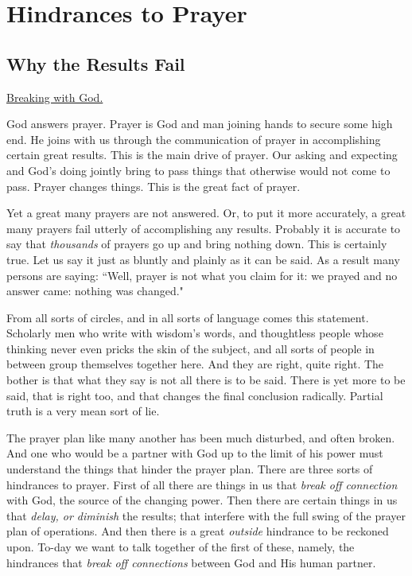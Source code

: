 \part{ Hindrances to Prayer}





\chapter{Why the Results Fail}



\underline{Breaking with God.}


God answers prayer. Prayer is God and man joining hands to secure some
high end. He joins with us through the communication of prayer in
accomplishing certain great results. This is the main drive of prayer. Our
asking and expecting and God's doing jointly bring to pass things that
otherwise would not come to pass. Prayer changes things. This is the great
fact of prayer.

Yet a great many prayers are not answered. Or, to put it more accurately,
a great many prayers fail utterly of accomplishing any results. Probably
it is accurate to say that \textit{thousands} of prayers go up and bring nothing
down. This is certainly true. Let us say it just as bluntly and plainly as
it can be said. As a result many persons are saying: ``Well, prayer is not
what you claim for it: we prayed and no answer came: nothing was changed."

From all sorts of circles, and in all sorts of language comes this
statement. Scholarly men who write with wisdom's words, and thoughtless
people whose thinking never even pricks the skin of the subject, and all
sorts of people in between group themselves together here. And they are
right, quite right. The bother is that what they say is not all there is
to be said. There is yet more to be said, that is right too, and that
changes the final conclusion radically. Partial truth is a very mean sort
of lie.

The prayer plan like many another has been much disturbed, and often
broken. And one who would be a partner with God up to the limit of his
power must understand the things that hinder the prayer plan. There are
three sorts of hindrances to prayer. First of all there are things in us
that \textit{break off connection} with God, the source of the changing power.
Then there are certain things in us that \textit{delay, or diminish} the results;
that interfere with the full swing of the prayer plan of operations. And
then there is a great \textit{outside} hindrance to be reckoned upon. To-day we
want to talk together of the first of these, namely, the hindrances that
\textit{break off connections} between God and His human partner.

